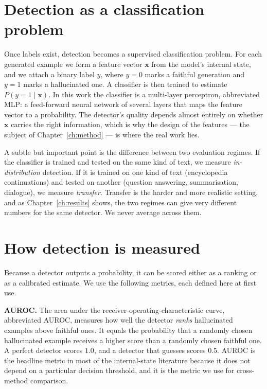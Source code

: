 \section{Detection as a classification problem}

Once labels exist, detection becomes a supervised classification problem. For each
generated example we form a feature vector $\mathbf{x}$ from the model's internal state,
and we attach a binary label $y$, where $y=0$ marks a faithful generation and $y=1$
marks a hallucinated one. A classifier is then trained to estimate
$P(y = 1 \mid \mathbf{x})$. In this work the classifier is a multi-layer perceptron,
abbreviated MLP: a feed-forward neural network of several layers that maps the feature
vector to a probability. The detector's quality depends almost entirely on whether
$\mathbf{x}$ carries the right information, which is why the design of the features ---
the subject of Chapter~\ref{ch:method} --- is where the real work lies.

A subtle but important point is the difference between two evaluation regimes. If the
classifier is trained and tested on the same kind of text, we measure
\emph{in-distribution} detection. If it is trained on one kind of text (encyclopedia
continuations) and tested on another (question answering, summarisation, dialogue), we
measure \emph{transfer}. Transfer is the harder and more realistic setting, and as
Chapter~\ref{ch:results} shows, the two regimes can give very different numbers for the
same detector. We never average across them.

\section{How detection is measured}

Because a detector outputs a probability, it can be scored either as a ranking or as a
calibrated estimate. We use the following metrics, each defined here at first use.

\textbf{AUROC.} The area under the receiver-operating-characteristic curve, abbreviated
AUROC, measures how well the detector \emph{ranks} hallucinated examples above faithful
ones. It equals the probability that a randomly chosen hallucinated example receives a
higher score than a randomly chosen faithful one. A perfect detector scores $1.0$, and
a detector that guesses scores $0.5$. AUROC is the headline metric in most of the
internal-state literature because it does not depend on a particular decision threshold,
and it is the metric we use for cross-method comparison.

